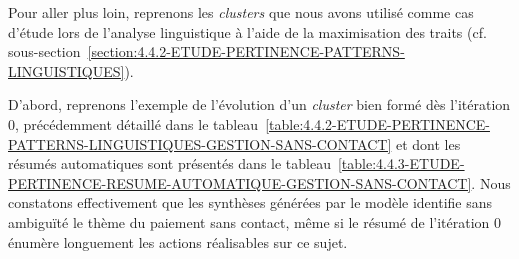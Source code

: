 			Pour aller plus loin, reprenons les \textit{clusters} que nous avons utilisé comme cas d'étude lors de l'analyse linguistique à l'aide de la maximisation des traits (cf. sous-section~\ref{section:4.4.2-ETUDE-PERTINENCE-PATTERNS-LINGUISTIQUES}).
			
			D'abord, reprenons l'exemple de l'évolution d'un \textit{cluster} bien formé dès l'itération $0$, précédemment détaillé dans le tableau~\ref{table:4.4.2-ETUDE-PERTINENCE-PATTERNS-LINGUISTIQUES-GESTION-SANS-CONTACT} et dont les résumés automatiques sont présentés dans le tableau~\ref{table:4.4.3-ETUDE-PERTINENCE-RESUME-AUTOMATIQUE-GESTION-SANS-CONTACT}.
			Nous constatons effectivement que les synthèses générées par le modèle identifie sans ambiguïté le thème du paiement sans contact, même si le résumé de l'itération $0$ énumère longuement les actions réalisables sur ce sujet.
			
			

